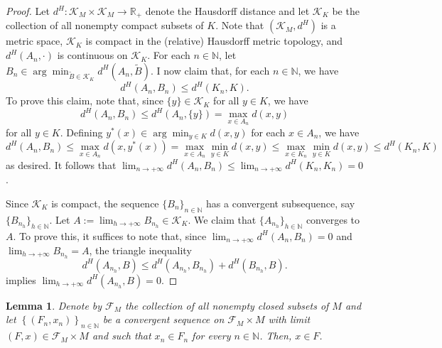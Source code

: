 \documentclass[12pt, oneside]{amsart}
\newtheorem{lemma}{Lemma}
\theoremstyle{definition}
\begin{document}
\begin{proof}
Let $d^H : \mathcal{K}_M \times \mathcal{K}_M \to \mathbb{R}_+$ denote the Hausdorff distance and let $\mathcal{K}_K$ be the collection of all nonempty compact subsets of $K$. Note that $\left(\mathcal{K}_M, d^H\right)$ is a metric space, $\mathcal{K}_K$ is compact in the (relative) Hausdorff metric topology, and $d^H(A_n, \cdot)$ is continuous on $\mathcal{K}_K$. For each $n \in \mathbb{N}$, let $B_n \in \arg\min_{\tilde{B} \in \mathcal{K}_K} d^H(A_n, \tilde{B})$. I now claim that, for each $n \in \mathbb{N}$, we have
\[
d^H(A_n, B_n) \leq d^H(K_n, K).
\]
To prove this claim, note that, since $\{y\} \in \mathcal{K}_K$ for all $y \in K$, we have
\[
d^H(A_n, B_n) \leq d^H(A_n, \{y\}) = \max_{x \in A_n}d(x,y)
\]
for all $y \in K$. Defining $y^*(x) \in \arg\min_{y \in K} d(x,y)$ for each $x \in A_n$, we have
\[
d^H(A_n, B_n) \leq \max_{x \in A_n} d(x,y^*(x)) = \max_{x \in A_n}\min_{y \in K} d(x,y) \leq \max_{x \in K_n}\min_{y \in K} d(x,y) \leq d^H(K_n, K)
\]
as desired. It follows that $\lim_{n \to +\infty} d^H(A_n , B_n) \leq \lim_{n \to +\infty} d^H(K_n , K_n) = 0$.

Since $\mathcal{K}_K$ is compact, the sequence $\{B_n\}_{n \in \mathbb{N}}$ has a convergent subsequence, say $\{B_{n_h}\}_{h \in \mathbb{N}}$. Let $A := \lim_{h \to +\infty} B_{n_h} \in \mathcal{K}_K$. We claim that $\{A_{n_h}\}_{h \in \mathbb{N}}$ converges to $A$.
To prove this, it suffices to note that, since $\lim_{n \to +\infty} d^H(A_n , B_n) = 0$ and $\lim_{h\to+\infty} B_{n_h} = A$, the triangle inequality
\[
d^H(A_{n_h}, B) \leq d^H(A_{n_h}, B_{n_h})+d^H(B_{n_h}, B). 
\]
implies $\lim_{h\to +\infty} d^H(A_{n_h}, B) = 0$.
\end{proof}


\begin{lemma}
\label{lemma:closed-convergence}
Denote by $\mathcal{F}_M$ the collection of all nonempty closed subsets of $M$ and let $\left\{\left(F_n, x_n\right)\right\}_{n \in \mathbb{N}}$ be a convergent sequence on $\mathcal{F}_M \times M$ with limit $\left(F, x\right) \in \mathcal{F}_M \times M$ and such that $x_n \in F_n$ for every $n \in \mathbb{N}$. 
Then, $x \in F$.
\end{lemma}
\end{document}
